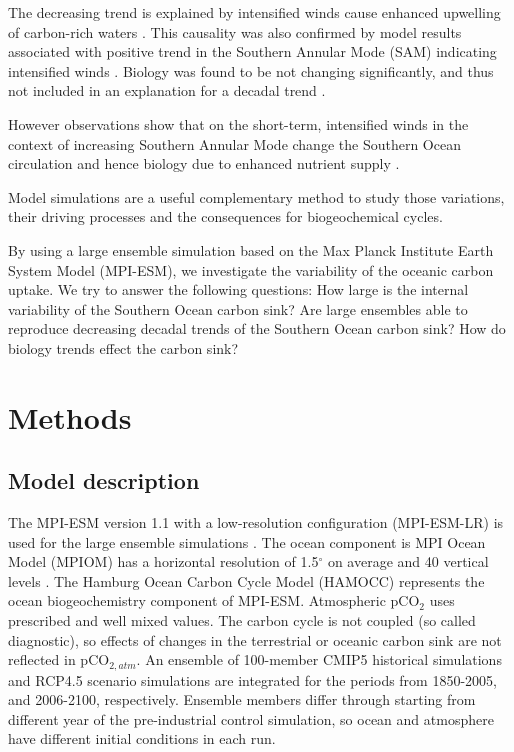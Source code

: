 \documentclass[12pt]{article}
\begin{document}
The decreasing trend is explained by intensified winds cause enhanced upwelling of carbon-rich waters \cite{LeQuere2007}. This causality was also confirmed by model results associated with positive trend in the Southern Annular Mode (SAM) indicating intensified winds \cite{Lovenduski2007,Lovenduski2008}. Biology was found to be not changing significantly, and thus not included in an explanation for a decadal trend \cite{LeQuere2007,Lovenduski2008}.

However observations show that on the short-term, intensified winds in the context of increasing Southern Annular Mode change the  Southern Ocean circulation and hence biology due to enhanced nutrient supply \cite{Lovenduski2005}.

Model simulations are a useful complementary method to study those variations, their driving processes and the consequences for biogeochemical cycles.

By using a large ensemble simulation based on the Max Planck Institute Earth System Model (MPI-ESM), we investigate the variability of the oceanic carbon uptake. We try to answer the following questions: How large is the internal variability of the Southern Ocean carbon sink? Are large ensembles able to reproduce decreasing decadal trends of the Southern Ocean carbon sink? How do biology trends effect the carbon sink?


\section{Methods}

\subsection{Model description}
The MPI-ESM version 1.1 with a low-resolution configuration (MPI-ESM-LR) is used for the large ensemble simulations \cite{Giorgetta2013}. The ocean component is MPI Ocean Model (MPIOM) has a horizontal resolution of 1.5$^\circ$ on average and 40 vertical levels \cite{Jungclaus2013}. The Hamburg Ocean Carbon Cycle Model (HAMOCC) \cite{Ilyina2013} represents the ocean biogeochemistry component of MPI-ESM. 
Atmospheric pCO$_2$ uses prescribed and well mixed values. The carbon cycle is not coupled (so called diagnostic), so effects of changes in the terrestrial or oceanic carbon sink are not reflected in pCO$_{2,atm}$.   
An ensemble of 100-member CMIP5 historical simulations and RCP4.5 scenario simulations are integrated for the periods from 1850-2005, and 2006-2100, respectively. Ensemble members differ through starting from different year of the pre-industrial control simulation, so ocean and atmosphere have different initial conditions in each run. 
\end{document}
